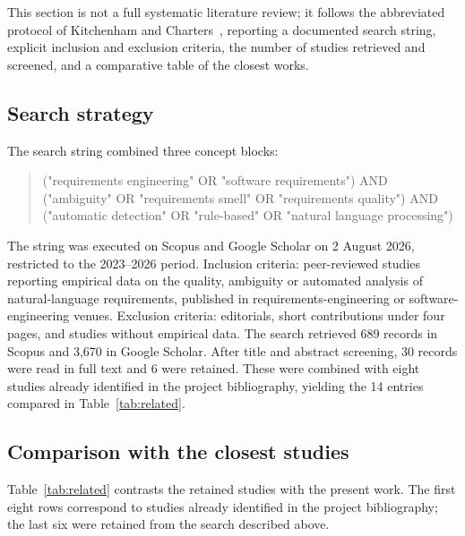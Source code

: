 \documentclass[pdflatex,sn-mathphys-num]{sn-jnl}
\theoremstyle{thmstyleone}%
\theoremstyle{thmstyletwo}%
\theoremstyle{thmstylethree}%
\begin{document}
This section is not a full systematic literature review; it follows the
abbreviated protocol of Kitchenham and Charters~\cite{kitchenham2007},
reporting a documented search string, explicit inclusion and exclusion criteria,
the number of studies retrieved and screened, and a comparative table of the
closest works.

\subsection{Search strategy}\label{subsec:search}

The search string combined three concept blocks:

\begin{quote}\small\ttfamily
("requirements engineering" OR "software requirements") AND
("ambiguity" OR "requirements smell" OR "requirements quality") AND
("automatic detection" OR "rule-based" OR "natural language processing")
\end{quote}

The string was executed on Scopus and Google Scholar on 2 August 2026,
restricted to the 2023--2026 period. Inclusion criteria: peer-reviewed
studies reporting empirical data on the quality, ambiguity or automated analysis
of natural-language requirements, published in requirements-engineering or
software-engineering venues. Exclusion criteria: editorials, short contributions
under four pages, and studies without empirical data. The search retrieved
689 records in Scopus and 3,670 in Google Scholar. After title and abstract
screening, 30 records were read in full text and 6 were retained. These were
combined with eight studies already identified in the project bibliography,
yielding the 14 entries compared in Table~\ref{tab:related}.

\subsection{Comparison with the closest studies}\label{subsec:comparison}

Table~\ref{tab:related} contrasts the retained studies with the present work.
The first eight rows correspond to studies already identified in the project
bibliography; the last six were retained from the search described above.
\end{document}
